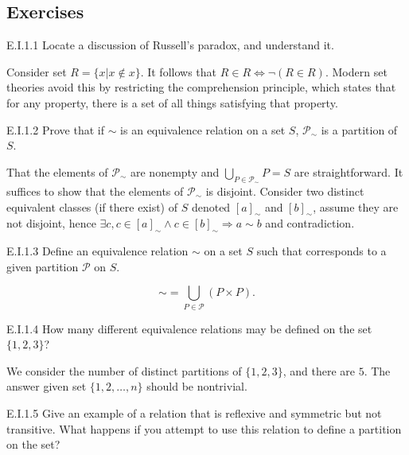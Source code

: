 \subsection*{Exercises}

\begin{exercise}{E.I.1.1}
  Locate a discussion of Russell’s paradox, and understand it.
\end{exercise}

Consider set $R=\{x|x\notin x\}$. It follows that $R\in R \Leftrightarrow\neg(R\in R)$. Modern set theories avoid this by restricting the comprehension principle, which states that for any property, there is a set of all things satisfying that property.

\begin{exercise}{E.I.1.2}
  Prove that if $\sim$ is an equivalence relation on a set $S$, $\mathcal{P}_{\sim}$ is a partition of $S$.
\end{exercise}

That the elements of $\mathcal{P}_{\sim}$ are nonempty and $\bigcup_{P\in \mathcal{P}_{\sim}}P=S$ are straightforward. It suffices to show that the elements of $\mathcal{P}_{\sim}$ is disjoint. Consider two distinct equivalent classes (if there exist) of $S$ denoted $[a]_{\sim}$ and $[b]_{\sim}$, assume they are not disjoint, hence $\exists c, c\in[a]_{\sim}\wedge c\in[b]_{\sim}\Rightarrow a\sim b$ and contradiction.

\begin{exercise}{E.I.1.3}
  Define an equivalence relation $\sim$ on a set $S$ such that corresponds to a given partition $\mathcal{P}$ on $S$.
\end{exercise}

\[
  \sim=\bigcup_{P\in \mathcal{P}}(P\times P).
\]

\begin{exercise}{E.I.1.4}
  How many diﬀerent equivalence relations may be defined on the set $\{1,2,3\}$?
\end{exercise}

We consider the number of distinct partitions of $\{1,2,3\}$, and there are $5$. The answer given set $\{1,2,\dots,n\}$ should be nontrivial.

\begin{exercise}{E.I.1.5}
  Give an example of a relation that is reflexive and symmetric but not transitive. What happens if you attempt to use this relation to define a partition on the set?
\end{exercise}

